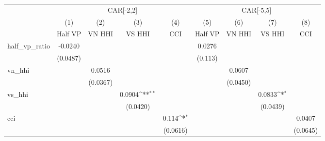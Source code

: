 {
\def\sym#1{\ifmmode^{#1}\else\(^{#1}\)\fi}
\begin{tabular}{l*{8}{c}}
\hline\hline
                    &\multicolumn{4}{c}{CAR[-2,2]}                                                          &\multicolumn{4}{c}{CAR[-5,5]}                                                          \\
                    &\multicolumn{1}{c}{(1)}&\multicolumn{1}{c}{(2)}&\multicolumn{1}{c}{(3)}&\multicolumn{1}{c}{(4)}&\multicolumn{1}{c}{(5)}&\multicolumn{1}{c}{(6)}&\multicolumn{1}{c}{(7)}&\multicolumn{1}{c}{(8)}\\
                    &\multicolumn{1}{c}{Half VP}&\multicolumn{1}{c}{VN HHI}&\multicolumn{1}{c}{VS HHI}&\multicolumn{1}{c}{CCI}&\multicolumn{1}{c}{Half VP}&\multicolumn{1}{c}{VN HHI}&\multicolumn{1}{c}{VS HHI}&\multicolumn{1}{c}{CCI}\\
\hline
half\_vp\_ratio       &     -0.0240         &                     &                     &                     &      0.0276         &                     &                     &                     \\
                    &    (0.0487)         &                     &                     &                     &     (0.113)         &                     &                     &                     \\
vn\_hhi              &                     &      0.0516         &                     &                     &                     &      0.0607         &                     &                     \\
                    &                     &    (0.0367)         &                     &                     &                     &    (0.0450)         &                     &                     \\
vs\_hhi              &                     &                     &      0.0904\sym{**} &                     &                     &                     &      0.0833\sym{*}  &                     \\
                    &                     &                     &    (0.0420)         &                     &                     &                     &    (0.0439)         &                     \\
cci                 &                     &                     &                     &       0.114\sym{*}  &                     &                     &                     &      0.0407         \\
                    &                     &                     &                     &    (0.0616)         &                     &                     &                     &    (0.0645)         \\

\end{tabular}}
